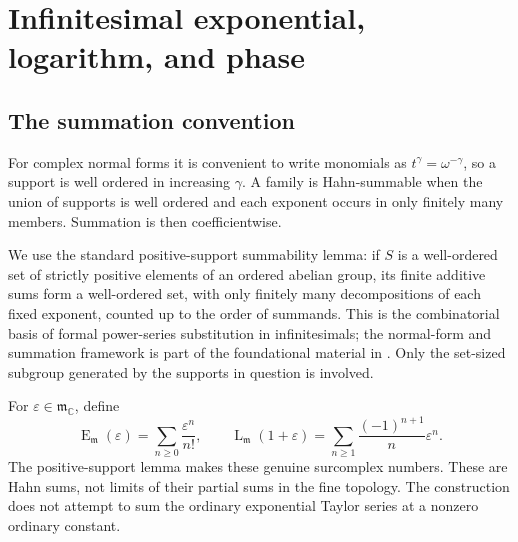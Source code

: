 \documentclass[11pt,letterpaper]{article}
\numberwithin{equation}{section}
\theoremstyle{definition}
\theoremstyle{remark}
\newcommand{\C}{\mathbb C}
\newcommand{\mm}{\mathfrak m}
\newcommand{\Em}{\operatorname{E}_{\mm}}
\newcommand{\Lm}{\operatorname{L}_{\mm}}
\newcommand{\eps}{\varepsilon}
\begin{document}
\section{Infinitesimal exponential, logarithm, and phase}\label{sec:phase}

\subsection{The summation convention}
For complex normal forms it is convenient to write monomials as $t^\gamma=\omega^{-\gamma}$, so a support is well ordered in increasing $\gamma$. A family is Hahn-summable when the union of supports is well ordered and each exponent occurs in only finitely many members. Summation is then coefficientwise.

We use the standard positive-support summability lemma: if $S$ is a well-ordered set of strictly positive elements of an ordered abelian group, its finite additive sums form a well-ordered set, with only finitely many decompositions of each fixed exponent, counted up to the order of summands. This is the combinatorial basis of formal power-series substitution in infinitesimals; the normal-form and summation framework is part of the foundational material in \cite{BM}. Only the set-sized subgroup generated by the supports in question is involved.

For $\eps\in\mm_\C$, define
\begin{equation}\label{eq:explog}
 \Em(\eps)=\sum_{n\geq0}\frac{\eps^n}{n!},\qquad
 \Lm(1+\eps)=\sum_{n\geq1}\frac{(-1)^{n+1}}{n}\eps^n.
\end{equation}
The positive-support lemma makes these genuine surcomplex numbers. These are Hahn sums, not limits of their partial sums in the fine topology. The construction does not attempt to sum the ordinary exponential Taylor series at a nonzero ordinary constant.
\end{document}
